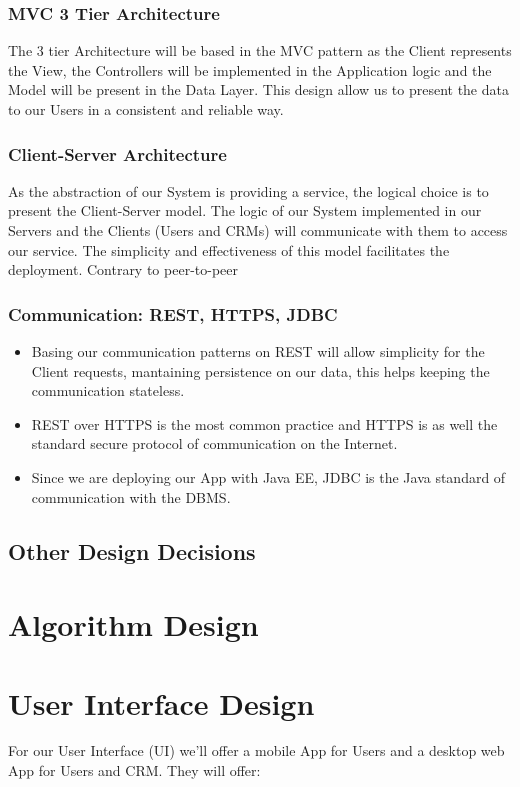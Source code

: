 \documentclass[a4paper]{article}
\begin{document}
\subsubsection{MVC 3 Tier Architecture}
The 3 tier Architecture will be based in the MVC pattern as the Client represents the View, the Controllers will be implemented in the Application logic and the Model will be present in the Data Layer. This design allow us to present the data to our Users in a consistent and reliable way.
\subsubsection{Client-Server Architecture}
As the abstraction of our System is providing a service, the logical choice is to present the Client-Server model. The logic of our System implemented in our Servers and the Clients (Users and CRMs) will communicate with them to access our service. The simplicity and effectiveness of this model facilitates the deployment. Contrary to peer-to-peer 
\newpage
\subsubsection{Communication: REST, HTTPS, JDBC}
\begin{itemize}
\item Basing our communication patterns on REST will allow simplicity for the Client requests, mantaining persistence on our data, this helps keeping the communication stateless. 
\item  REST over HTTPS is the most common practice and HTTPS is as well the standard secure protocol of communication on the Internet. 
\item Since we are deploying our App with Java EE, JDBC is the Java standard of communication with the DBMS.
\end{itemize}

\subsection{Other Design Decisions}

\newpage
\section{Algorithm Design}

\newpage
\section{User Interface Design}
For our User Interface (UI) we'll offer a mobile App for Users and a desktop web App for Users and CRM. They will offer:
\end{document}
